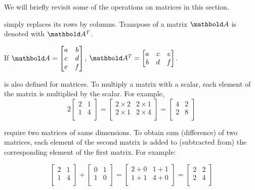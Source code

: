 We will briefly revisit some of the operations on matrices in this section.

 simply replaces its rows by columns.
Transpose of a matrix $\vect{A}$ is denoted with $\vect{A}^{T}$.

\begin{center}
  If $\vect{A} = \begin{bmatrix} a & b \\ c & d \\ e & f \\ \end{bmatrix}$,
  $\vect{A}^{T} = \begin{bmatrix} a & c & e\\ b & d  & f \\ \end{bmatrix}$.
\end{center}

 is also defined for matrices.
To multiply a matrix with a scalar,
each element of the matrix is multiplied by the scalar.
For example,
\[
    2 \begin{bmatrix} 2 & 1 \\ 1 & 4 \\ \end{bmatrix} =
    \begin{bmatrix}
      2\times{}2 & 2\times{}1 \\
      2\times{}1 & 2\times{}4 \\
    \end{bmatrix} =
    \begin{bmatrix}
      4 & 2 \\
      2 & 8 \\
    \end{bmatrix}
\]

 require two matrices of same dimensions.
To obtain sum (difference) of two matrices,
each element of the second matrix is added to (subtracted from)
the corresponding element of the first matrix.
For example:

  \[
      \begin{bmatrix}
        2 & 1 \\
        1 & 4 \\
      \end{bmatrix} +
      \begin{bmatrix}
        0 & 1 \\
        1 & 0 \\
      \end{bmatrix} =
      \begin{bmatrix}
        2+0 & 1+1 \\
        1+1 & 4+0 \\
      \end{bmatrix} =
      \begin{bmatrix}
        2 & 2 \\
        2 & 4 \\
      \end{bmatrix}
  \]


